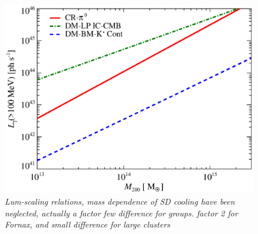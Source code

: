 \documentclass[10pt,aps,pra,reprint,amsmath,amsfonts,amssymb,showpacs]{revtex4-1}
\begin{document}
\begin{figure}
  \includegraphics[width=0.99\columnwidth]{figures/MLscaling.eps}
  \caption{\it Lum-scaling relations, mass dependence of SD cooling
    have been neglected, actually a factor few difference for
    groups. factor 2 for Fornax, and small difference for large
    clusters}
 \label{fig:lum_mass_scaling}
\end{figure}
\end{document}
